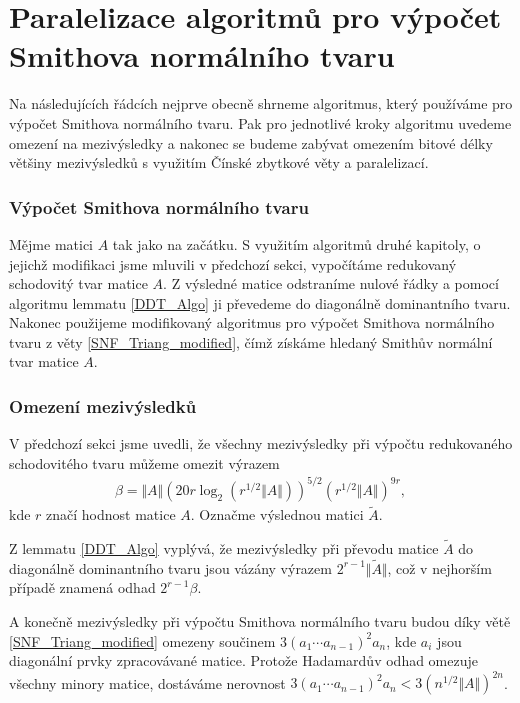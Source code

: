 \section{Paralelizace algoritmů pro výpočet Smithova normálního tvaru}

Na následujících řádcích nejprve obecně shrneme algoritmus, který používáme pro 
výpočet Smithova normálního tvaru. Pak pro jednotlivé kroky algoritmu uvedeme 
omezení na mezivýsledky a nakonec se budeme zabývat omezením bitové délky většiny
mezivýsledků s využitím Čínské zbytkové věty a paralelizací.

\subsubsection{Výpočet Smithova normálního tvaru}

Mějme matici $ A $ tak jako na začátku. S využitím algoritmů 
druhé kapitoly, o jejichž modifikaci jsme mluvili v předchozí sekci, vypočítáme
redukovaný schodovitý tvar matice $ A $. Z výsledné matice odstraníme nulové 
řádky a pomocí algoritmu lemmatu \ref{DDT_Algo} ji převedeme do diagonálně
dominantního tvaru. Nakonec použijeme modifikovaný algoritmus pro výpočet 
Smithova normálního tvaru z věty \ref{SNF_Triang_modified}, čímž získáme hledaný
Smithův normální tvar matice $ A $.


\subsubsection{Omezení mezivýsledků}

V předchozí sekci jsme uvedli, že všechny mezivýsledky při výpočtu redukovaného
schodovitého tvaru můžeme omezit výrazem
\begin{align*}
    \beta = \Vert A \Vert (20 r \log_2{ (r^{1/2} \Vert A \Vert) })^{5/2} (r^{1/2} \Vert A \Vert)^{9 r} ,
\end{align*}
kde $ r $ značí hodnost matice $ A $. Označme výslednou matici $ \tilde{A} $.

Z lemmatu \ref{DDT_Algo} vyplývá, že mezivýsledky při převodu matice $ \tilde{A} $ 
do diagonálně dominantního tvaru jsou vázány výrazem 
$ 2^{r - 1} \Vert \tilde{A} \Vert $, což v nejhorším případě znamená odhad 
$ 2^{r - 1} \beta $.

A konečně mezivýsledky při výpočtu Smithova normálního tvaru budou díky větě
\ref{SNF_Triang_modified} omezeny součinem $ 3 (a_1 \cdots a_{n - 1})^2 a_n $,
kde $ a_i $ jsou diagonální prvky zpracovávané matice. Protože 
Hadamardův odhad omezuje všechny minory matice, dostáváme nerovnost
$ 3 (a_1 \cdots a_{n - 1})^2 a_n < 3 (n^{1/2} \Vert A \Vert)^{2 n} $.


